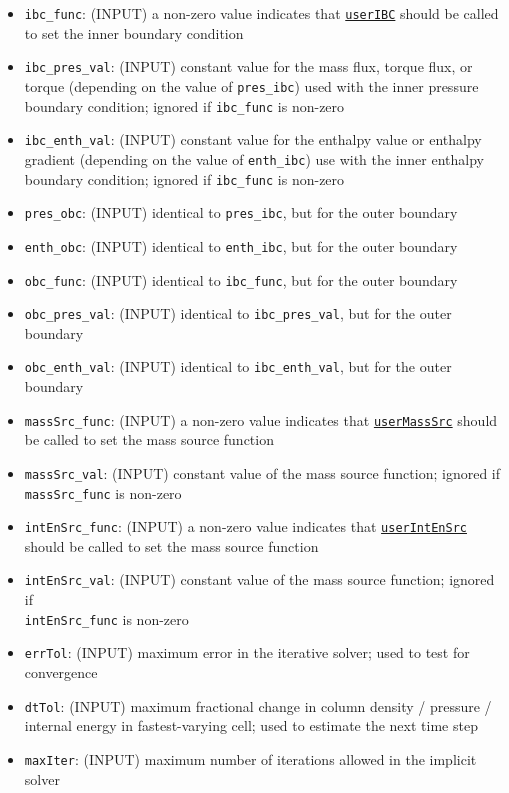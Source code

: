 \documentclass[12pt]{article}
\begin{document}
\begin{itemize}
\item \verb=ibc_func=: (INPUT) a non-zero value indicates that \hyperref[sssec:userIBC]{\texttt{userIBC}} should be called to set the inner boundary condition
\item \verb=ibc_pres_val=: (INPUT) constant value for the mass flux, torque flux, or torque (depending on the value of \verb=pres_ibc=) used with the inner pressure boundary condition; ignored if \verb=ibc_func= is non-zero
\item \verb=ibc_enth_val=: (INPUT) constant value for the enthalpy value or enthalpy gradient (depending on the value of \verb=enth_ibc=) use with the inner enthalpy boundary condition; ignored if \verb=ibc_func= is non-zero
\item \verb=pres_obc=: (INPUT) identical to \verb=pres_ibc=, but for the outer boundary
\item \verb=enth_obc=: (INPUT) identical to \verb=enth_ibc=, but for the outer boundary
\item \verb=obc_func=: (INPUT) identical to \verb=ibc_func=, but for the outer boundary
\item \verb=obc_pres_val=: (INPUT) identical to \verb=ibc_pres_val=, but for the outer boundary
\item \verb=obc_enth_val=: (INPUT) identical to \verb=ibc_enth_val=, but for the outer boundary
\item \verb=massSrc_func=: (INPUT) a non-zero value indicates that \hyperref[sssec:userMassSrc]{\texttt{userMassSrc}} should be called to set the mass source function
\item \verb=massSrc_val=: (INPUT) constant value of the mass source function; ignored if\\
\verb=massSrc_func= is non-zero
\item \verb=intEnSrc_func=: (INPUT) a non-zero value indicates that \hyperref[sssec:userIntEnSrc]{\texttt{userIntEnSrc}} should be called to set the mass source function
\item \verb=intEnSrc_val=: (INPUT) constant value of the mass source function; ignored if \\\verb=intEnSrc_func= is non-zero
\item \texttt{errTol}: (INPUT) maximum error in the iterative solver; used to test for convergence
\item \texttt{dtTol}: (INPUT) maximum fractional change in column density / pressure / internal energy in fastest-varying cell; used to estimate the next time step
\item \texttt{maxIter}: (INPUT) maximum number of iterations allowed in the implicit solver

\end{itemize}
\end{document}
